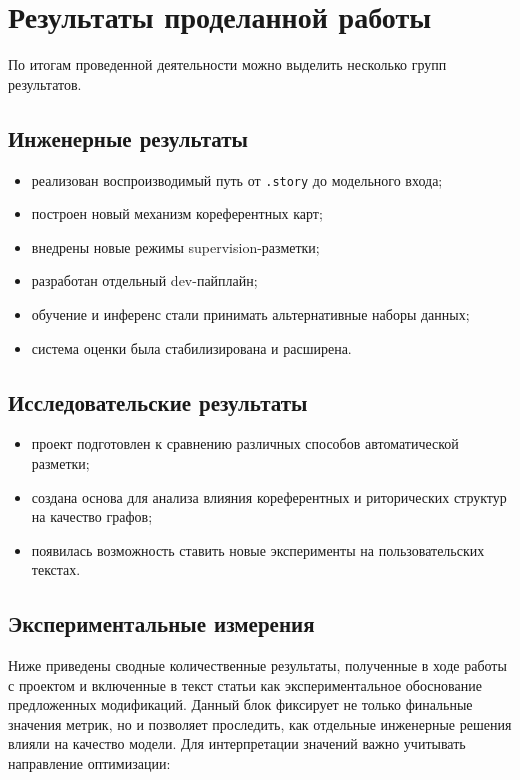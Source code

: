 \documentclass[12pt,a4paper]{article}
\begin{document}
\section{Результаты проделанной работы}

По итогам проведенной деятельности можно выделить несколько групп результатов.

\subsection{Инженерные результаты}

\begin{itemize}
    \item реализован воспроизводимый путь от \texttt{.story} до модельного входа;
    \item построен новый механизм кореферентных карт;
    \item внедрены новые режимы supervision-разметки;
    \item разработан отдельный dev-пайплайн;
    \item обучение и инференс стали принимать альтернативные наборы данных;
    \item система оценки была стабилизирована и расширена.
\end{itemize}

\subsection{Исследовательские результаты}

\begin{itemize}
    \item проект подготовлен к сравнению различных способов автоматической разметки;
    \item создана основа для анализа влияния кореферентных и риторических структур на
    качество графов;
    \item появилась возможность ставить новые эксперименты на пользовательских текстах.
\end{itemize}

\subsection{Экспериментальные измерения}

Ниже приведены сводные количественные результаты, полученные в ходе работы с проектом
и включенные в текст статьи как экспериментальное обоснование предложенных
модификаций. Данный блок фиксирует не только финальные значения метрик, но и
позволяет проследить, как отдельные инженерные решения влияли на качество модели.
Для интерпретации значений важно учитывать направление оптимизации:
\end{document}
